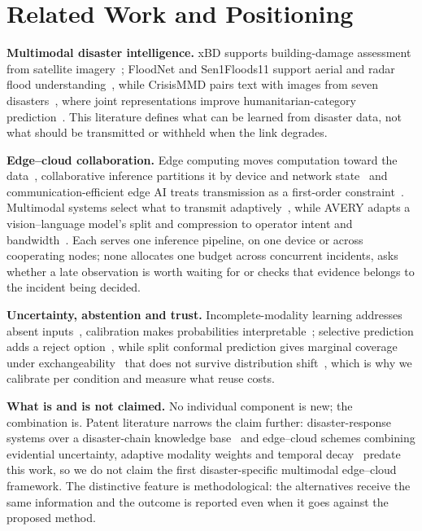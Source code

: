 \documentclass[conference,a4paper]{IEEEtran}
\begin{document}
\fi
\section{Related Work and Positioning}
\textbf{Multimodal disaster intelligence.} xBD supports building-damage assessment from
satellite imagery~\cite{xbd}; FloodNet and Sen1Floods11 support aerial and radar flood
understanding~\cite{floodnet,sen1floods}, while CrisisMMD pairs text with images from seven
disasters~\cite{crisismmd}, where joint representations improve humanitarian-category
prediction~\cite{ofli2020}. This literature defines what can be learned from disaster data, not what
should be transmitted or withheld when the link degrades.

\textbf{Edge--cloud collaboration.} Edge computing moves computation toward the
data~\cite{shi2016,satya2017}, collaborative inference partitions it by device and network
state~\cite{neurosurgeon} and communication-efficient edge AI treats transmission as a
first-order constraint~\cite{shi2020}. Multimodal systems select what to transmit
adaptively~\cite{dat,cst}, while AVERY adapts a vision--language model's split and
compression to operator intent and bandwidth~\cite{avery}. Each serves one inference pipeline, on one device or across cooperating nodes;
none allocates one budget across concurrent incidents, asks whether a late
observation is worth waiting for or checks that evidence belongs to the incident being
decided.

\textbf{Uncertainty, abstention and trust.} Incomplete-modality learning addresses absent
inputs~\cite{chen2023}, calibration makes probabilities
interpretable~\cite{guo2017}; selective prediction adds a reject
option~\cite{selectivenet}, while split conformal prediction gives marginal coverage under
exchangeability~\cite{sadinle,romano} that does not survive distribution
shift~\cite{ovadia}, which is why we calibrate per condition and measure what reuse costs.

\textbf{What is and is not claimed.} No individual component is new; the combination is.
Patent literature narrows the claim further: disaster-response systems over a
disaster-chain knowledge base~\cite{patent1} and edge--cloud schemes combining evidential
uncertainty, adaptive modality weights and temporal decay~\cite{patent2} predate this work,
so we do not claim the first disaster-specific multimodal edge--cloud framework. The distinctive
feature is methodological: the alternatives receive the same information and the outcome is
reported even when it goes against the proposed method.
\end{document}
